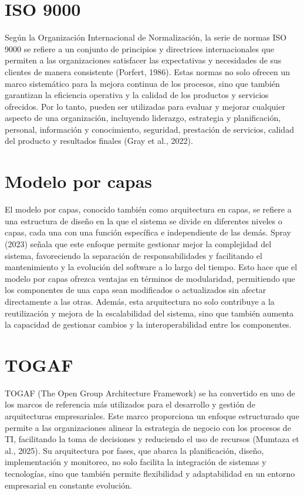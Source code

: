 \section{ISO 9000}
Según la Organización Internacional de Normalización, la serie de normas ISO 9000 se refiere a
un conjunto de principios y directrices internacionales que permiten a las organizaciones
satisfacer las expectativas y necesidades de sus clientes de manera consistente (Porfert, 1986).
Estas normas no solo ofrecen un marco sistemático para la mejora continua de los procesos, sino
que también garantizan la eficiencia operativa y la calidad de los productos y servicios ofrecidos.
Por lo tanto, pueden ser utilizadas para evaluar y mejorar cualquier aspecto de una organización,
incluyendo liderazgo, estrategia y planificación, personal, información y conocimiento,
seguridad, prestación de servicios, calidad del producto y resultados finales (Gray et al., 2022).


\section{Modelo por capas}
El modelo por capas, conocido también como arquitectura en capas, se refiere a una estructura
de diseño en la que el sistema se divide en diferentes niveles o capas, cada una con una función
específica e independiente de las demás. Spray (2023) señala que este enfoque permite gestionar
mejor la complejidad del sistema, favoreciendo la separación de responsabilidades y facilitando
el mantenimiento y la evolución del software a lo largo del tiempo. Esto hace que el modelo por
capas ofrezca ventajas en términos de modularidad, permitiendo que los componentes de una
capa sean modificados o actualizados sin afectar directamente a las otras. Además, esta
arquitectura no solo contribuye a la reutilización y mejora de la escalabilidad del sistema, sino
que también aumenta la capacidad de gestionar cambios y la interoperabilidad entre los
componentes.


\section{TOGAF}
TOGAF (The Open Group Architecture Framework) se ha convertido en uno de los marcos de
referencia más utilizados para el desarrollo y gestión de arquitecturas empresariales. Este marco
proporciona un enfoque estructurado que permite a las organizaciones alinear la estrategia de
negocio con los procesos de TI, facilitando la toma de decisiones y reduciendo el uso de recursos
(Mumtaza et al., 2025). Su arquitectura por fases, que abarca la planificación, diseño,
implementación y monitoreo, no solo facilita la integración de sistemas y tecnologías, sino que
también permite flexibilidad y adaptabilidad en un entorno empresarial en constante evolución.

